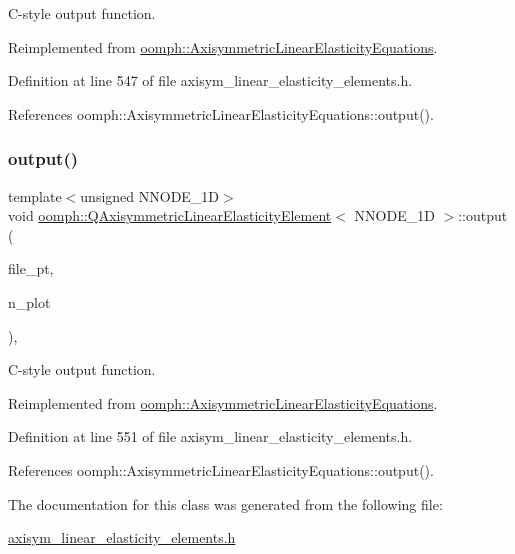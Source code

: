 C-\/style output function. 



Reimplemented from \hyperlink{classoomph_1_1AxisymmetricLinearElasticityEquations_a8a96657fee4dd85fdbbf25d0855c27f2}{oomph\+::\+Axisymmetric\+Linear\+Elasticity\+Equations}.



Definition at line 547 of file axisym\+\_\+linear\+\_\+elasticity\+\_\+elements.\+h.



References oomph\+::\+Axisymmetric\+Linear\+Elasticity\+Equations\+::output().

\mbox{\label{classoomph_1_1QAxisymmetricLinearElasticityElement_a50c3225e93aad5867288cf55aac73195}} 
\subsubsection{\texorpdfstring{output()}{output()}\hspace{0.1cm}{\footnotesize\ttfamily [4/4]}}
{\footnotesize\ttfamily template$<$unsigned N\+N\+O\+D\+E\+\_\+1D$>$ \\
void \hyperlink{classoomph_1_1QAxisymmetricLinearElasticityElement}{oomph\+::\+Q\+Axisymmetric\+Linear\+Elasticity\+Element}$<$ N\+N\+O\+D\+E\+\_\+1D $>$\+::output (\begin{DoxyParamCaption}\item[{F\+I\+LE $\ast$}]{file\+\_\+pt,  }\item[{const unsigned \&}]{n\+\_\+plot }\end{DoxyParamCaption})\hspace{0.3cm}{\ttfamily [inline]}, {\ttfamily [virtual]}}



C-\/style output function. 



Reimplemented from \hyperlink{classoomph_1_1AxisymmetricLinearElasticityEquations_ae706158f52c6251de990b640787e608b}{oomph\+::\+Axisymmetric\+Linear\+Elasticity\+Equations}.



Definition at line 551 of file axisym\+\_\+linear\+\_\+elasticity\+\_\+elements.\+h.



References oomph\+::\+Axisymmetric\+Linear\+Elasticity\+Equations\+::output().



The documentation for this class was generated from the following file\+:\begin{DoxyCompactItemize}
\item 
\hyperlink{axisym__linear__elasticity__elements_8h}{axisym\+\_\+linear\+\_\+elasticity\+\_\+elements.\+h}\end{DoxyCompactItemize}
